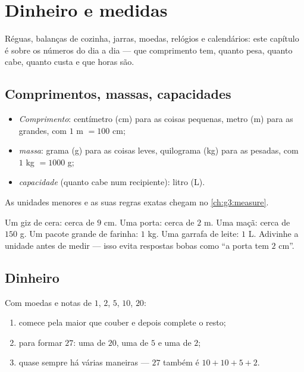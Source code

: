\chapter{Dinheiro e medidas}\label{ch:g2:measure}

Réguas, balanças de cozinha, jarras, moedas, relógios e
calendários: este capítulo é sobre os números do dia a dia --- que
comprimento tem, quanto pesa, quanto cabe, quanto custa e que horas
são.

\section{Comprimentos, massas, capacidades}

\begin{definition}\label{def:g2:measure:units}
\begin{itemize}
  \item \emph{Comprimento}: centímetro (cm) para as coisas pequenas,
        metro (m) para as grandes, com $1$ m $= 100$ cm;
  \item \emph{massa}: grama (g) para as coisas leves, quilograma
        (kg) para as pesadas, com $1$ kg $= 1000$ g;
  \item \emph{capacidade} (quanto cabe num recipiente): litro (L).
\end{itemize}
As unidades menores e as suas regras exatas chegam no
\cref{ch:g3:measure}.
\end{definition}

\begin{example}\label{ex:g2:measure:choose}
Um giz de cera: cerca de $9$ cm. Uma porta: cerca de $2$ m. Uma
maçã: cerca de $150$ g. Um pacote grande de farinha: $1$ kg. Uma
garrafa de leite: $1$ L. Adivinhe a unidade antes de medir --- isso
evita respostas bobas como ``a porta tem $2$ cm''.
\end{example}

\section{Dinheiro}

\begin{method}\label{met:g2:measure:money}
Com moedas e notas de $1$, $2$, $5$, $10$, $20$:
\begin{enumerate}
  \item comece pela maior que couber e depois complete o resto;
  \item para formar $27$: uma de $20$, uma de $5$ e uma de $2$;
  \item quase sempre há várias maneiras --- $27$ também é
        $10 + 10 + 5 + 2$.
\end{enumerate}
\end{method}

